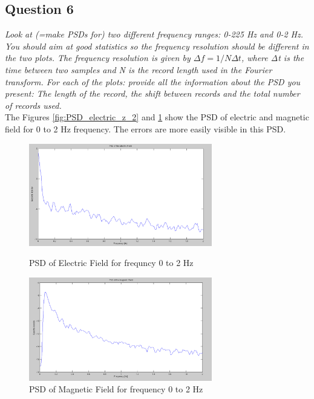 \documentclass{article}
\begin{document}
\subsection{Question 6}
\textit{Look at (=make PSDs for) two different frequency ranges: 0-225 Hz and 0-2 Hz. You should aim at good statistics so the frequency resolution should be different in the two plots. The frequency resolution is given by $Δf=1/NΔt$, where Δt is the time between two samples and N is the record length used in the Fourier transform. For each of the plots: provide all the information about the PSD you present: The length of the record, the shift between records and the total number of records used.}\\

The Figures \ref{fig:PSD_electric_z_2} and \ref{fig:PSD_magnetic_z_2} show the PSD of electric and magnetic field for 0 to 2 Hz frequency. The errors are more easily visible in this PSD.

\begin{figure}[htb!]
\begin{minipage}[c]{0.5\linewidth}
\centering
\includegraphics[width=8cm]{Figures/PSD_electric_z_2.png}
\caption{PSD of Electric Field for frequncy 0 to 2 Hz}
\label{fig:PSD_electric_z_2}
\end{minipage}
\hspace{0.1cm}
\begin{minipage}[c]{0.5\linewidth}
\centering
\includegraphics[width=8cm]{Figures/PSD_magnetic_z_2.png}
\caption{PSD of Magnetic Field for frequency 0 to 2 Hz}
\label{fig:PSD_magnetic_z_2}
\end{minipage}
\end{figure}
\end{document}
